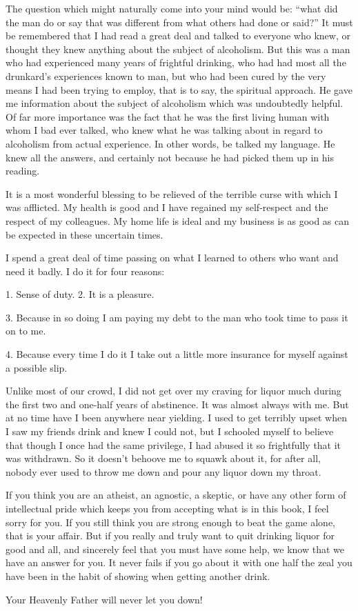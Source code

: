 \begin{biblechapter}
The question which might naturally come into your mind would be: “what did the man do or say that was different from what others had done or said?” It must be remembered that I had read a great deal and talked to everyone who knew, or thought they knew anything about the subject of alcoholism. But this was a man who had experienced many years of frightful drinking, who had had most all the drunkard’s experiences known to man, but who had been cured by the very means I had been trying to employ, that is to say, the spiritual approach. He gave me information about the subject of alcoholism which was undoubtedly helpful. Of far more importance was the fact that he was the first living human with whom I bad ever talked, who knew what he was talking about in regard to alcoholism from actual experience. In other words, be talked my language. He knew all the answers, and certainly not because he had picked them up in his reading.

It is a most wonderful blessing to be relieved of the terrible curse with which I was afflicted. My health is good and I have regained my self-respect and the respect of my colleagues. My home life is ideal and my business is as good as can be expected in these uncertain times.

I spend a great deal of time passing on what I learned to others who want and need it badly. I do it for four reasons:

1. Sense of duty.
2. It is a pleasure.

3. Because in so doing I am paying my debt to the man who took time to pass it on to me.

4. Because every time I do it I take out a little more insurance for myself against a possible slip.

Unlike most of our crowd, I did not get over my craving for liquor much during the first two and one-half years of abstinence. It was almost always with me. But at no time have I been anywhere near yielding. I used to get terribly upset when I saw my friends drink and knew I could not, but I schooled myself to believe that though I once had the same privilege, I had abused it so frightfully that it was withdrawn. So it doesn’t behoove me to squawk about it, for after all, nobody ever used to throw me down and pour any liquor down my throat.

If you think you are an atheist, an agnostic, a skeptic, or have any other form of intellectual pride which keeps you from accepting what is in this book, I feel sorry for you. If you still think you are strong enough to beat the game alone, that is your affair. But if you really and truly want to quit drinking liquor for good and all, and sincerely feel that you must have some help, we know that we have an answer for you. It never fails if you go about it with one half the zeal you have been in the habit of showing when getting another drink.

Your Heavenly Father will never let you down!

\end{biblechapter}
